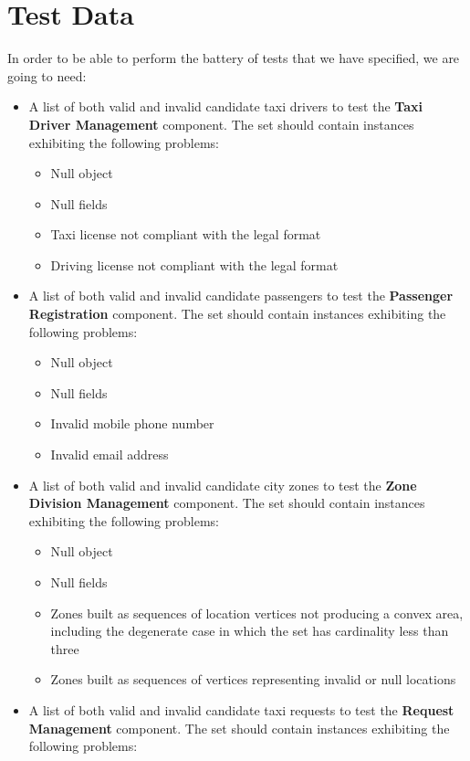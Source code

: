 \section{Test Data}
In order to be able to perform the battery of tests that we have specified, we are going to need:
\begin{itemize}
	\item A list of both valid and invalid candidate taxi drivers to test the \textbf{Taxi Driver Management} component. The set should contain instances exhibiting the following problems: 
		\begin{itemize}
		\item Null object
		\item Null fields
		\item Taxi license not compliant with the legal format
		\item Driving license not compliant with the legal format 
		\end{itemize}
	\item A list of both valid and invalid candidate passengers to test the \textbf{Passenger Registration} component. The set should contain instances exhibiting the following problems: 
	\begin{itemize}
		\item Null object
		\item Null fields
		\item Invalid mobile phone number
		\item Invalid email address
		\end{itemize}
	\item A list of both valid and invalid candidate city zones to test the \textbf{Zone Division Management} component. The set should contain instances exhibiting the following problems: 
	\begin{itemize}
		\item Null object
		\item Null fields
		\item Zones built as sequences of location vertices not producing a convex area, including the degenerate case in which the set has cardinality less than three
		\item Zones built as sequences of vertices representing invalid or null locations
		\end{itemize}
	\item A list of both valid and invalid candidate taxi requests to test the \textbf{Request Management} component. The set should contain instances exhibiting the following problems: 

\end{itemize}

